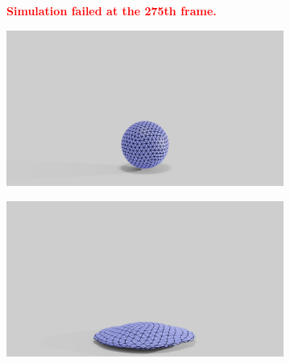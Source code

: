 \begin{figure}[htp!]
\begin{subfigure}{.16\linewidth}
\begin {tikzpicture}
		\end {tikzpicture}
		\label{sfig:ball-0495-3}
	\end{subfigure}
	\begin{subfigure}{.48\linewidth}
		\centering
		\textcolor{red}{\textbf{Simulation failed at the 275th frame.}}
	\end{subfigure}\hfill
	\begin{subfigure}{.03\linewidth}
	\end{subfigure}%
	\begin{subfigure}{.16\linewidth}
		\centering
		{\includegraphics[width=2.0\textwidth]{images/coarse_ball/vp/0200.jpg}}
		\label{sfig:ball-vc-1}
	\end{subfigure}%
	\begin{subfigure}{.16\linewidth}
		\centering
		{\includegraphics[width=2.0\textwidth]{images/coarse_ball/vp/0250.jpg}}
		\label{sfig:ball-vc-2}

\end{subfigure}
\end{figure}

